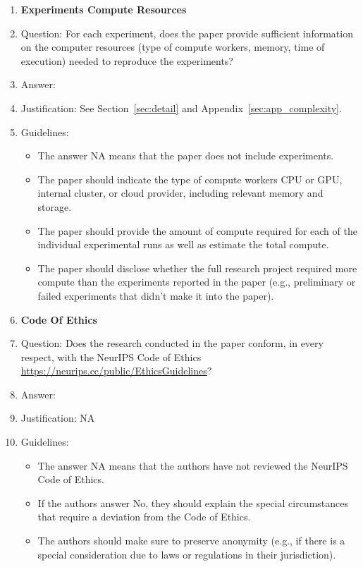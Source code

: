 \documentclass{article}
\begin{document}
\begin{enumerate}
\item {\bf Experiments Compute Resources}
    \item[] Question: For each experiment, does the paper provide sufficient information on the computer resources (type of compute workers, memory, time of execution) needed to reproduce the experiments?
    \item[] Answer: \answerYes{} %
    \item[] Justification: See Section~\ref{sec:detail} and Appendix~\ref{sec:app_complexity}.
    \item[] Guidelines:
    \begin{itemize}
        \item The answer NA means that the paper does not include experiments.
        \item The paper should indicate the type of compute workers CPU or GPU, internal cluster, or cloud provider, including relevant memory and storage.
        \item The paper should provide the amount of compute required for each of the individual experimental runs as well as estimate the total compute. 
        \item The paper should disclose whether the full research project required more compute than the experiments reported in the paper (e.g., preliminary or failed experiments that didn't make it into the paper). 
    \end{itemize}
    
\item {\bf Code Of Ethics}
    \item[] Question: Does the research conducted in the paper conform, in every respect, with the NeurIPS Code of Ethics \url{https://neurips.cc/public/EthicsGuidelines}?
    \item[] Answer: \answerYes{} %
    \item[] Justification: NA
    \item[] Guidelines:
    \begin{itemize}
        \item The answer NA means that the authors have not reviewed the NeurIPS Code of Ethics.
        \item If the authors answer No, they should explain the special circumstances that require a deviation from the Code of Ethics.
        \item The authors should make sure to preserve anonymity (e.g., if there is a special consideration due to laws or regulations in their jurisdiction).
    \end{itemize}



\end{enumerate}
\end{document}
